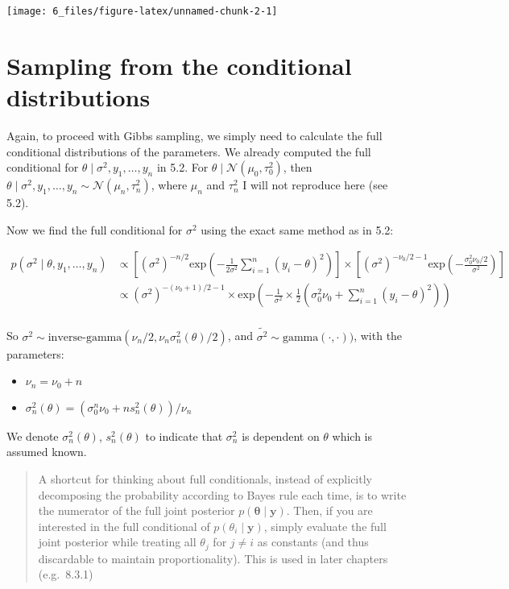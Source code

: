 \documentclass[]{article}
\providecommand{\tightlist}{%
  \setlength{\itemsep}{0pt}\setlength{\parskip}{0pt}}
\begin{document}
\begin{center}\texttt{[image: 6\_files/figure-latex/unnamed-chunk-2-1]} \end{center}

\hypertarget{sampling-from-the-conditional-distributions}{%
\section{Sampling from the conditional
distributions}\label{sampling-from-the-conditional-distributions}}

Again, to proceed with Gibbs sampling, we simply need to calculate the
full conditional distributions of the parameters. We already computed
the full conditional for \(\theta \mid \sigma^2, y_1, \dots, y_n\) in
5.2. For \(\theta \mid \mathcal{N}(\mu_0, \tau_0^2)\), then
\(\theta \mid \sigma^2, y_1, \dots, y_n \sim \mathcal{N}(\mu_n, \tau_n^2)\),
where \(\mu_n\) and \(\tau_n^2\) I will not reproduce here (see 5.2).

Now we find the full conditional for \(\sigma^2\) using the exact same
method as in 5.2:

\begin{align}
p(\sigma^2 \mid \theta, y_1, \dots, y_n) &\propto
\left[(\sigma^2)^{-n/2} \text{exp}\left(-\frac{1}{2\sigma^2} \sum_{i = 1}^n (y_i - \theta)^2 \right) \right] \times \left[ (\sigma^2)^{- \nu_0 / 2 - 1} \text{exp} \left(-\frac{\sigma_0^2 \nu_0 / 2}{\sigma^2} \right) \right] \\
&\propto (\sigma^2)^{-(\nu_0 + 1) / 2 - 1} \times \text{exp}\left(-\frac{1}{\sigma^2} \times \frac{1}{2}\left(\sigma_0^2 \nu_0 + \sum_{i=1}^{n} (y_i - \theta)^2 \right) \right) \\
\end{align}

So
\(\sigma^2 \sim \text{inverse-gamma}(\nu_n / 2, \nu_n \sigma_n^2(\theta) / 2)\),
and \(\tilde{\sigma^2} \sim \text{gamma}(\cdot, \cdot))\), with the
parameters:

\begin{itemize}
\tightlist
\item
  \(\nu_n = \nu_0 + n\)
\item
  \(\sigma_n^2(\theta) = (\sigma_0^n \nu_0 + n s_n^2(\theta)) / \nu_n\)
\end{itemize}

We denote \(\sigma_n^2(\theta)\), \(s_n^2(\theta)\) to indicate that
\(\sigma_n^2\) is dependent on \(\theta\) which is assumed known.

\begin{quote}
A shortcut for thinking about full conditionals, instead of explicitly
decomposing the probability according to Bayes rule each time, is to
write the numerator of the full joint posterior
\(p(\boldsymbol{\theta} \mid \mathbf{y})\). Then, if you are interested
in the full conditional of \(p(\theta_i \mid \mathbf{y})\), simply
evaluate the full joint posterior while treating all \(\theta_j\) for
\(j \neq i\) as constants (and thus discardable to maintain
proportionality). This is used in later chapters (e.g.~8.3.1)
\end{quote}
\end{document}
